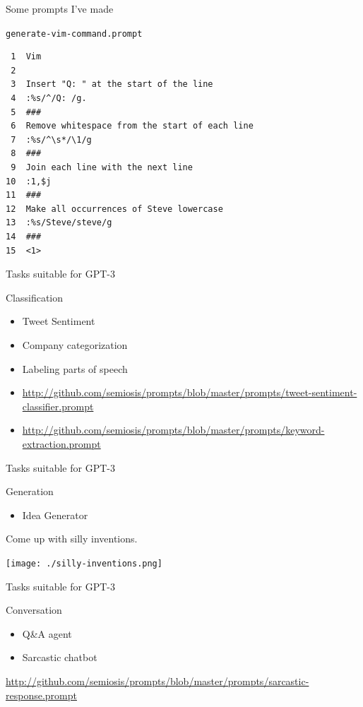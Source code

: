 \documentclass[presentation]{beamer}
\begin{document}
\begin{frame}[label={sec:org086e396},fragile]{Some prompts I've made}
 \begin{block}{\texttt{generate-vim-command.prompt}}
{\footnotesize
\begin{verbatim}
 1  Vim
 2  
 3  Insert "Q: " at the start of the line
 4  :%s/^/Q: /g.
 5  ###
 6  Remove whitespace from the start of each line
 7  :%s/^\s*/\1/g
 8  ###
 9  Join each line with the next line
10  :1,$j
11  ###
12  Make all occurrences of Steve lowercase
13  :%s/Steve/steve/g
14  ###
15  <1>
\end{verbatim}
}
\end{block}
\end{frame}

\begin{frame}[label={sec:org2f1ec3a}]{Tasks suitable for GPT-3}
\begin{block}{Classification}
\begin{itemize}
\item Tweet Sentiment
\item Company categorization
\item Labeling parts of speech
\end{itemize}

{\footnotesize
\begin{itemize}
\item \url{http://github.com/semiosis/prompts/blob/master/prompts/tweet-sentiment-classifier.prompt}
\item \url{http://github.com/semiosis/prompts/blob/master/prompts/keyword-extraction.prompt}
\end{itemize}
}
\end{block}
\end{frame}

\begin{frame}[label={sec:orga42e18f}]{Tasks suitable for GPT-3}
\begin{block}{Generation}
\begin{itemize}
\item Idea Generator
\end{itemize}

Come up with silly inventions.

\begin{center}
\texttt{[image: ./silly-inventions.png]}
\end{center}
\end{block}
\end{frame}

\begin{frame}[label={sec:org4f1465a}]{Tasks suitable for GPT-3}
\begin{block}{Conversation}
\begin{itemize}
\item Q\&A agent
\item Sarcastic chatbot
\end{itemize}

{\footnotesize
\url{http://github.com/semiosis/prompts/blob/master/prompts/sarcastic-response.prompt}
}
\end{block}
\end{frame}
\end{document}
